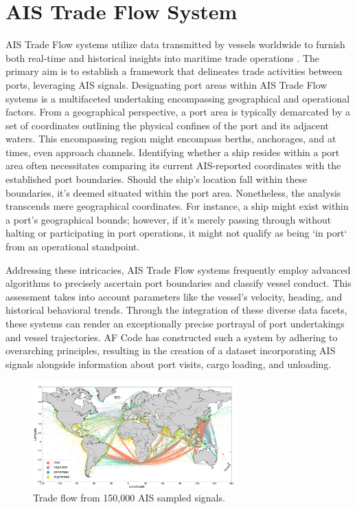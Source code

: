 \section{AIS Trade Flow System}

AIS Trade Flow systems utilize data transmitted by vessels worldwide to furnish both real-time and historical insights into maritime trade operations \autocite{halden2019estimation}. 
The primary aim is to establish a framework that delineates trade activities between ports, leveraging AIS signals. 
Designating port areas within AIS Trade Flow systems is a multifaceted undertaking encompassing geographical and operational factors. 
From a geographical perspective, a port area is typically demarcated by a set of coordinates outlining the physical confines of the port and its adjacent waters. 
This encompassing region might encompass berths, anchorages, and at times, even approach channels. Identifying whether a ship resides within a port area often necessitates comparing its current AIS-reported coordinates with the established port boundaries. 
Should the ship's location fall within these boundaries, it's deemed situated within the port area. 
Nonetheless, the analysis transcends mere geographical coordinates. 
For instance, a ship might exist within a port's geographical bounds; 
however, if it's merely passing through without halting or participating in port operations, it might not qualify as being `in port` from an operational standpoint.

Addressing these intricacies, AIS Trade Flow systems frequently employ advanced algorithms to precisely ascertain port boundaries and classify vessel conduct. 
This assessment takes into account parameters like the vessel's velocity, heading, and historical behavioral trends. 
Through the integration of these diverse data facets, these systems can render an exceptionally precise portrayal of port undertakings and vessel trajectories. 
AF Code has constructed such a system by adhering to overarching principles, resulting in the creation of a dataset incorporating AIS signals alongside information about port visits, cargo loading, and unloading.



\begin{figure}[h]
    \centering
    \includegraphics[width=0.7\textwidth]{images/tradeflow_system.png}
    \caption{Trade flow from 150,000 AIS sampled signals.}
    \label{tradeflow_system}
\end{figure}

